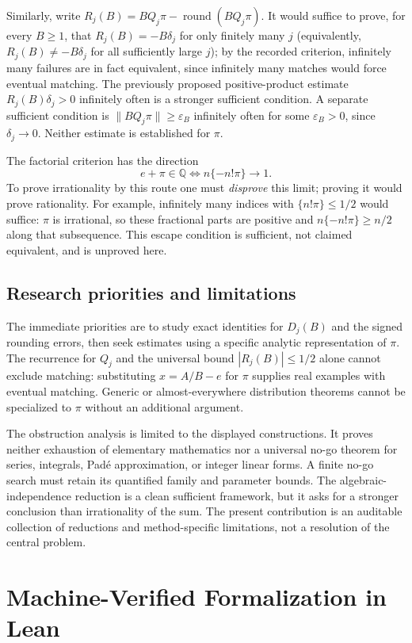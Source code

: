 \documentclass[11pt]{amsart}
\theoremstyle{definition}
\theoremstyle{remark}
\numberwithin{equation}{section}
\newcommand{\Q}{\mathbb{Q}}
\begin{document}
Similarly, write $R_j(B)=BQ_j\pi-\operatorname{round}(BQ_j\pi)$. It would suffice to prove, for every $B\ge1$, that $R_j(B)=-B\delta_j$ for only finitely many $j$ (equivalently, $R_j(B)\ne-B\delta_j$ for all sufficiently large $j$); by the recorded criterion, infinitely many failures are in fact equivalent, since infinitely many matches would force eventual matching. The previously proposed positive-product estimate $R_j(B)\delta_j>0$ infinitely often is a stronger sufficient condition. A separate sufficient condition is $\|BQ_j\pi\|\ge\varepsilon_B$ infinitely often for some $\varepsilon_B>0$, since $\delta_j\to0$. Neither estimate is established for $\pi$.

The factorial criterion has the direction
\[
e+\pi\in\Q\iff n\{-n!\pi\}\longrightarrow1.
\]
To prove irrationality by this route one must \emph{disprove} this limit; proving it would prove rationality. For example, infinitely many indices with $\{n!\pi\}\le1/2$ would suffice: $\pi$ is irrational, so these fractional parts are positive and $n\{-n!\pi\}\ge n/2$ along that subsequence. This escape condition is sufficient, not claimed equivalent, and is unproved here.

\subsection{Research priorities and limitations}

The immediate priorities are to study exact identities for $D_j(B)$ and the signed rounding errors, then seek estimates using a specific analytic representation of $\pi$. The recurrence for $Q_j$ and the universal bound $|R_j(B)|\le1/2$ alone cannot exclude matching: substituting $x=A/B-e$ for $\pi$ supplies real examples with eventual matching. Generic or almost-everywhere distribution theorems cannot be specialized to $\pi$ without an additional argument.

The obstruction analysis is limited to the displayed constructions. It proves neither exhaustion of elementary mathematics nor a universal no-go theorem for series, integrals, Pad\'e approximation, or integer linear forms. A finite no-go search must retain its quantified family and parameter bounds. The algebraic-independence reduction is a clean sufficient framework, but it asks for a stronger conclusion than irrationality of the sum. The present contribution is an auditable collection of reductions and method-specific limitations, not a resolution of the central problem.

\section{Machine-Verified Formalization in Lean}\label{sec:lean}
\end{document}
